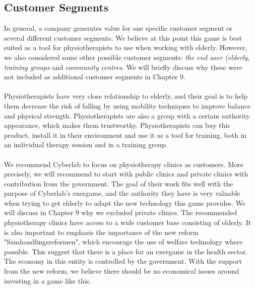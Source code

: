 \subsection{Customer Segments}
In general, a company generates value for one specific customer segment or several different customer segments. We believe at this point this game is best suited as a tool for physiotherapists to use when working with elderly. However, we also considered some other possible customer segments: \emph{the end user (elderly}, \emph{training groups} and \emph{community centres}. We will briefly discuss why these were not included as additional customer segments in Chapter 9.\\ \\ 
Physiotherapists have very close relationship to elderly, and their goal is to help them decrease the risk of falling by using mobility techniques to improve balance and physical strength. Physiotherapists are also a group with a certain authority appearance, which makes them trustworthy. Physiotherapists can buy this product, install it in their environment and use it as a tool for training, both in an individual therapy session and in a training group. \\ \\
We recommend Cyberlab to focus on physiotherapy clinics as customers. More precisely,  we will recommend to start with public clinics and private clinics with contribution from the government. The goal of their work fits well with the purpose of Cyberlab's exergame, and the authority they have is very valuable when trying to get elderly to adapt the new technology this game provides. We will discuss in Chapter 9 why we excluded private clinics. The recommended physiotherapy clinics have access to a wide customer base consisting of elderly. It is also important to emphasis the importance of the new reform "Samhandlingsreformen", which encourage the use of welfare technology where possible. This suggest that there is a place for an exergame in the health sector.  The economy in this entity is controlled by the government. With the support from the new reform, we believe there should be no economical issues around investing in a game like this. 

